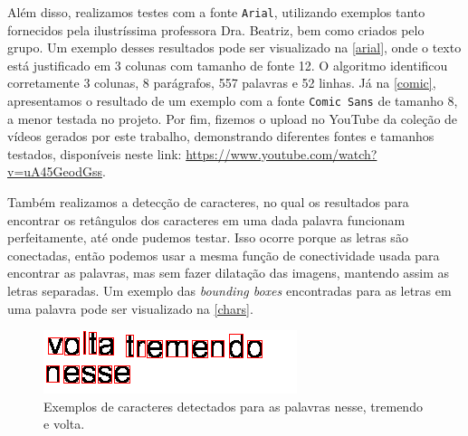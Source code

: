 \documentclass[english, 
               brazil, 
               bsc] %
               {dcomp-abntex2}
\begin{document}
Além disso, realizamos testes com a fonte \texttt{Arial}, utilizando exemplos tanto fornecidos pela ilustríssima professora Dra. Beatriz, bem como criados pelo grupo. Um exemplo desses resultados pode ser visualizado na \autoref{arial}, onde o texto está justificado em 3 colunas com tamanho de fonte 12. O algoritmo identificou corretamente 3 colunas, 8 parágrafos, 557 palavras e 52 linhas. Já na \autoref{comic}, apresentamos o resultado de um exemplo com a fonte \texttt{Comic Sans} de tamanho 8, a menor testada no projeto. Por fim, fizemos o upload no YouTube da coleção de vídeos gerados por este trabalho, demonstrando diferentes fontes e tamanhos testados, disponíveis neste link: \url{https://www.youtube.com/watch?v=uA45GeodGss}.


Também realizamos a detecção de caracteres, no qual os resultados para encontrar os retângulos dos caracteres em uma dada palavra funcionam perfeitamente, até onde pudemos testar. Isso ocorre porque as letras são conectadas, então podemos usar a mesma função de conectividade usada para encontrar as palavras, mas sem fazer dilatação das imagens, mantendo assim as letras separadas. Um exemplo das \textit{bounding boxes} encontradas para as letras em uma palavra pode ser visualizado na \autoref{chars}.


\begin{figure}[h]
        \caption{\label{chars} \small Exemplos de caracteres detectados para as palavras nesse, tremendo e volta. }
        \begin{center}
            \includegraphics[scale=0.55]{./images/ocr.png}
        \end{center}
\end{figure}
\end{document}
